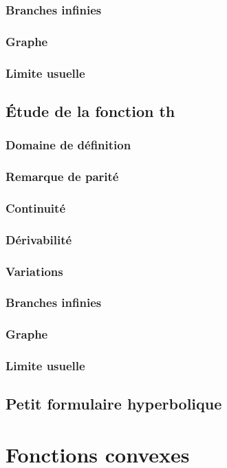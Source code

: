 \documentclass[12pt,a4paper,french]{book}
\begin{document}
		\subsection{Branches infinies}
		\subsection{Graphe}
		\subsection{Limite usuelle}
	\section{Étude de la fonction th}
		\subsection{Domaine de définition}
		\subsection{Remarque de parité}
		\subsection{Continuité}
		\subsection{Dérivabilité}
		\subsection{Variations}
		\subsection{Branches infinies}
		\subsection{Graphe}
		\subsection{Limite usuelle}
	\section{Petit formulaire hyperbolique}
\chapter{Fonctions convexes}
\end{document}
